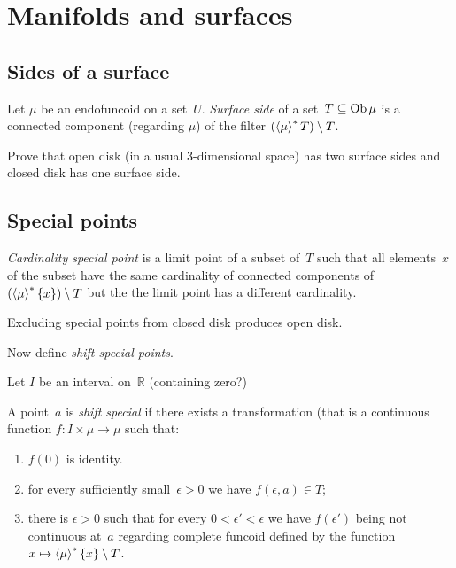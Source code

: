 \chapter{Manifolds and surfaces}

\section{Sides of a surface}

\begin{defn}
Let $\mu$ be an endofuncoid on a set~$U$.
\emph{Surface side} of a set~$T\subseteq\operatorname{Ob}\mu$ is a connected component
(regarding $\mu$) of the filter $(\left\langle \mu\right\rangle ^{\ast}T)\setminus T$.
\end{defn}

\begin{xca}
Prove that open disk (in a usual 3-dimensional space) has two surface sides
and closed disk has one surface side.
\end{xca}

\section{Special points}

\begin{defn}
\emph{Cardinality special point} is  a limit point of a subset of~$T$ such
that all elements~$x$ of the subset have the same cardinality of connected
components of $(\left\langle \mu\right\rangle ^{\ast}\{x\})\setminus T$ but the the limit point has
a different cardinality.
\end{defn}

\begin{xca}
Excluding special points from closed disk produces open disk.
\end{xca}

Now define \emph{shift special points}.

Let $I$ be an interval on~$\mathbb{R}$ (containing zero?)

A point~$a$ is \emph{shift special} if there exists a transformation
(that is a continuous function $f:I\times\mu\to\mu$ such that:
\begin{enumerate}
  \item $f(0)$ is identity. 
  \item for every sufficiently small~$\epsilon>0$ we have $f(\epsilon,a)\in T$;
  \item there is $\epsilon>0$ such that for every $0<\epsilon'<\epsilon$ we have
    $f(\epsilon')$ being not continuous at~$a$ regarding complete funcoid
    defined by the function $x\mapsto\left\langle \mu\right\rangle ^{\ast}\{x\}\setminus T$.
\end{enumerate}

